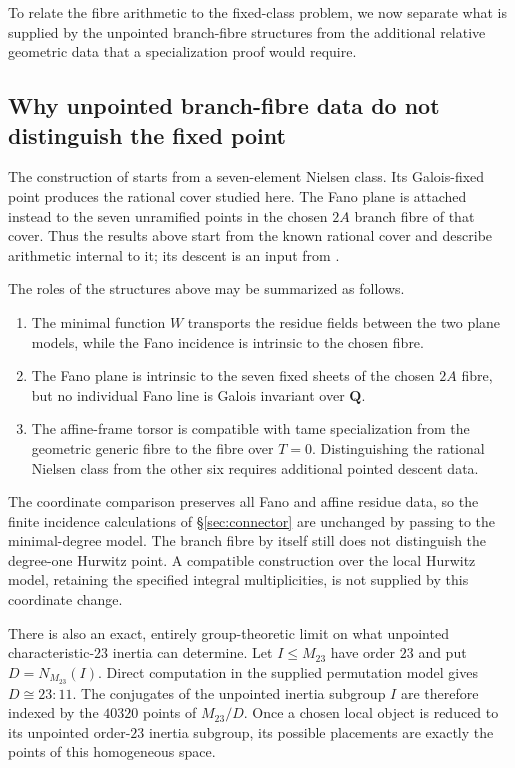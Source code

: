 \documentclass[11pt]{amsart}
\theoremstyle{definition}
\theoremstyle{remark}
\newcommand{\QQ}{\mathbf Q}
\newcommand{\Mtt}{M_{23}}
\begin{document}
To relate the fibre arithmetic to the fixed-class problem, we now separate
what is supplied by the unpointed branch-fibre structures from the additional
relative geometric data that a specialization proof would require.

\subsection{Why unpointed branch-fibre data do not distinguish the fixed point}
\label{sec:limits}

The construction of \cite{HJLPPZ} starts from a seven-element Nielsen class.
Its Galois-fixed point produces the rational cover studied here.  The Fano
plane is attached instead to the seven unramified points in the chosen $2A$
branch fibre of that cover.  Thus the results above start from the known
rational cover and describe arithmetic internal to it; its descent is an
input from \cite{HJLPPZ}.

The roles of the structures above may be summarized as follows.
\begin{enumerate}
\item The minimal function $W$ transports the residue fields between the two
  plane models, while the Fano incidence is intrinsic to the chosen fibre.
\item The Fano plane is intrinsic to the seven fixed sheets of the chosen
  $2A$ fibre, but no individual Fano line is Galois invariant over $\QQ$.
\item The affine-frame torsor is compatible with tame specialization from
  the geometric generic fibre to the fibre over $T=0$.  Distinguishing the
  rational Nielsen class from the other six requires additional pointed
  descent data.
\end{enumerate}

\smallskip
The coordinate comparison preserves all Fano and affine residue data, so the
finite incidence calculations of \S\ref{sec:connector} are unchanged by
passing to the minimal-degree model.  The branch fibre by itself still
does not distinguish the degree-one Hurwitz point.  A compatible
construction over the local Hurwitz model, retaining the specified
integral multiplicities, is not supplied by this coordinate change.

\smallskip
There is also an exact, entirely group-theoretic limit on what unpointed
characteristic-$23$ inertia can determine.  Let $I\leq\Mtt$ have order $23$
and put $D=N_{\Mtt}(I)$.  Direct computation in the supplied permutation model
gives $D\cong23{:}11$.  The conjugates of the unpointed inertia subgroup $I$ are
therefore indexed by the $40320$ points of $\Mtt/D$.  Once a chosen local
object is reduced to its unpointed order-$23$ inertia subgroup, its possible
placements are exactly the points of this homogeneous space.
\end{document}

